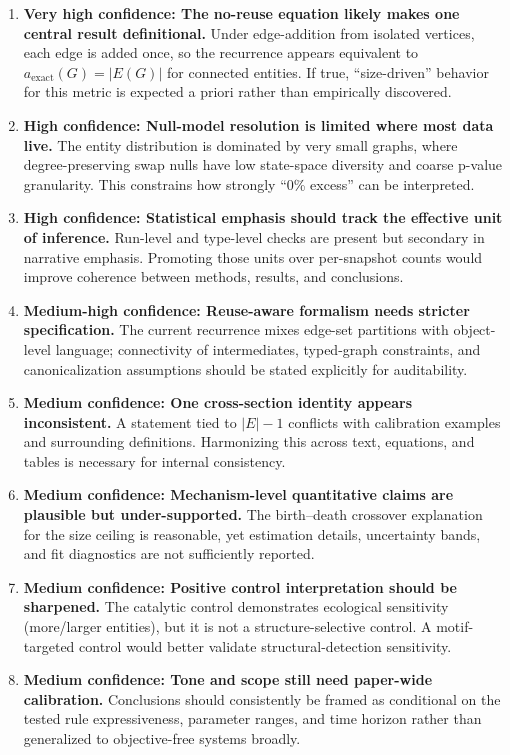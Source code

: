 \documentclass[11pt]{article}
\begin{document}
\begin{enumerate}
\item \textbf{Very high confidence: The no-reuse equation likely makes one central result definitional.}  
Under edge-addition from isolated vertices, each edge is added once, so the recurrence appears equivalent to $a_{\text{exact}}(G)=|E(G)|$ for connected entities. If true, ``size-driven'' behavior for this metric is expected a priori rather than empirically discovered.

\item \textbf{High confidence: Null-model resolution is limited where most data live.}  
The entity distribution is dominated by very small graphs, where degree-preserving swap nulls have low state-space diversity and coarse p-value granularity. This constrains how strongly ``0\% excess'' can be interpreted.

\item \textbf{High confidence: Statistical emphasis should track the effective unit of inference.}  
Run-level and type-level checks are present but secondary in narrative emphasis. Promoting those units over per-snapshot counts would improve coherence between methods, results, and conclusions.

\item \textbf{Medium-high confidence: Reuse-aware formalism needs stricter specification.}  
The current recurrence mixes edge-set partitions with object-level language; connectivity of intermediates, typed-graph constraints, and canonicalization assumptions should be stated explicitly for auditability.

\item \textbf{Medium confidence: One cross-section identity appears inconsistent.}  
A statement tied to $|E|-1$ conflicts with calibration examples and surrounding definitions. Harmonizing this across text, equations, and tables is necessary for internal consistency.

\item \textbf{Medium confidence: Mechanism-level quantitative claims are plausible but under-supported.}  
The birth--death crossover explanation for the size ceiling is reasonable, yet estimation details, uncertainty bands, and fit diagnostics are not sufficiently reported.

\item \textbf{Medium confidence: Positive control interpretation should be sharpened.}  
The catalytic control demonstrates ecological sensitivity (more/larger entities), but it is not a structure-selective control. A motif-targeted control would better validate structural-detection sensitivity.

\item \textbf{Medium confidence: Tone and scope still need paper-wide calibration.}  
Conclusions should consistently be framed as conditional on the tested rule expressiveness, parameter ranges, and time horizon rather than generalized to objective-free systems broadly.
\end{enumerate}
\end{document}
